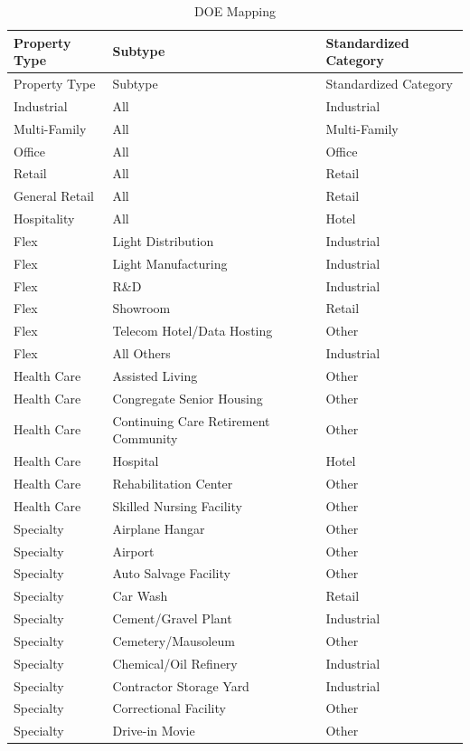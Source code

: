 \documentclass[
  12pt]{article}
\begin{document}
\begin{longtable}[]{@{}lll@{}}
\caption{DOE Mapping}\label{tbl-Mapping}\tabularnewline
\toprule\noalign{}
Property Type & Subtype & Standardized Category \\
\midrule\noalign{}
\endfirsthead
\toprule\noalign{}
Property Type & Subtype & Standardized Category \\
\midrule\noalign{}
\endhead
\bottomrule\noalign{}
\endlastfoot
Industrial & All & Industrial \\
Multi-Family & All & Multi-Family \\
Office & All & Office \\
Retail & All & Retail \\
General Retail & All & Retail \\
Hospitality & All & Hotel \\
Flex & Light Distribution & Industrial \\
Flex & Light Manufacturing & Industrial \\
Flex & R\&D & Industrial \\
Flex & Showroom & Retail \\
Flex & Telecom Hotel/Data Hosting & Other \\
Flex & All Others & Industrial \\
Health Care & Assisted Living & Other \\
Health Care & Congregate Senior Housing & Other \\
Health Care & Continuing Care Retirement Community & Other \\
Health Care & Hospital & Hotel \\
Health Care & Rehabilitation Center & Other \\
Health Care & Skilled Nursing Facility & Other \\
Specialty & Airplane Hangar & Other \\
Specialty & Airport & Other \\
Specialty & Auto Salvage Facility & Other \\
Specialty & Car Wash & Retail \\
Specialty & Cement/Gravel Plant & Industrial \\
Specialty & Cemetery/Mausoleum & Other \\
Specialty & Chemical/Oil Refinery & Industrial \\
Specialty & Contractor Storage Yard & Industrial \\
Specialty & Correctional Facility & Other \\
Specialty & Drive-in Movie & Other \\

\end{longtable}
\end{document}
